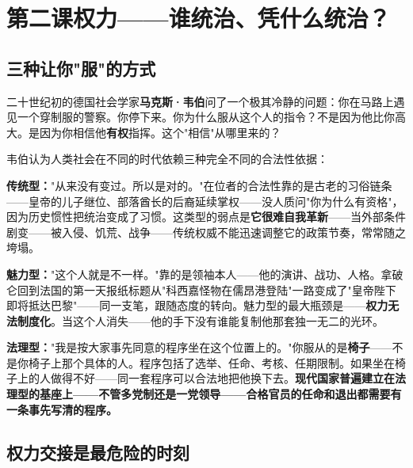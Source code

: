 \documentclass[a4paper,12pt]{ctexart}
\begin{document}
\newpage
\section{\textcolor{orange!80!black}{第二课\quad 权力——谁统治、凭什么统治？}}

\subsection*{三种让你"服"的方式}

二十世纪初的德国社会学家\textbf{马克斯·韦伯}问了一个极其冷静的问题：你在马路上遇见一个穿制服的警察。你停下来。你为什么服从这个人的指令？不是因为他比你高大。是因为你相信他\textbf{有权}指挥。这个"相信"从哪里来的？

韦伯认为人类社会在不同的时代依赖三种完全不同的合法性依据：

\textbf{传统型：}"从来没有变过。所以是对的。"在位者的合法性靠的是古老的习俗链条——皇帝的儿子继位、部落酋长的后裔延续掌权——没人质问"你为什么有资格"，因为历史惯性把统治变成了习惯。这类型的弱点是\textbf{它很难自我革新}——当外部条件剧变——被入侵、饥荒、战争——传统权威不能迅速调整它的政策节奏，常常随之垮塌。

\textbf{魅力型：}"这个人就是不一样。"靠的是领袖本人——他的演讲、战功、人格。拿破仑回到法国的第一天报纸标题从"科西嘉怪物在儒昂港登陆"一路变成了"皇帝陛下即将抵达巴黎"——同一支笔，跟随态度的转向。魅力型的最大瓶颈是——\textbf{权力无法制度化}。当这个人消失——他的手下没有谁能复制他那套独一无二的光环。

\textbf{法理型：}"我是按大家事先同意的程序坐在这个位置上的。"\:你服从的是\textbf{椅子}——不是你椅子上那个具体的人。程序包括了选举、任命、考核、任期限制。如果坐在椅子上的人做得不好——同一套程序可以合法地把他换下去。\:\textbf{现代国家普遍建立在法理型的基座上——不管多党制还是一党领导——合格官员的任命和退出都需要有一条事先写清的程序。}


\subsection*{权力交接是最危险的时刻}
\end{document}
